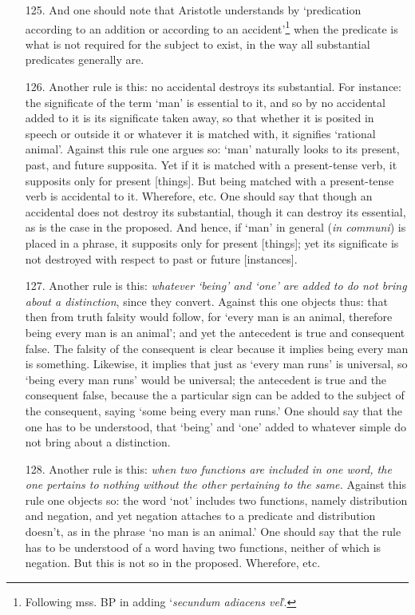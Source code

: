 \documentclass[]{article}
\begin{document}
\begin{itemize}
\item[125.] And one should note that Aristotle understands by `predication according to an addition or according to an accident'\footnote{Following mss. BP in adding `\textit{secundum adiacens vel}'.} when the predicate is what is not required for the subject to exist, in the way all substantial predicates generally are.
\item[126.] Another rule is this: no accidental destroys its substantial. For instance: the significate of the term `man' is essential to it, and so by no accidental added to it is its significate taken away, so that whether it is posited in speech or outside it or whatever it is matched with, it signifies `rational animal'. Against this rule one argues so: `man' naturally looks to its present, past, and future supposita. Yet if it is matched with a present-tense verb, it supposits only for present [things]. But being matched with a present-tense verb is accidental to it. Wherefore, etc. One should say that though an accidental does not destroy its substantial, though it can destroy its essential, as is the case in the proposed. And hence, if `man' in general (\textit{in communi}) is placed in a phrase, it supposits only for present [things]; yet its significate is not destroyed with respect to past or future [instances].
\item[127.] Another rule is this: \textit{whatever `being' and `one' are added to do not bring about a distinction}, since they convert. Against this one objects thus: that then from truth falsity would follow, for `every man is an animal, therefore being every man is an animal'; and yet the antecedent is true and consequent false. The falsity of the consequent is clear because it implies being every man is something. Likewise, it implies that just as `every man runs' is universal, so `being every man runs' would be universal; the antecedent is true and the consequent false, because the a particular sign can be added to the subject of the consequent, saying `some being every man runs.' One should say that the one has to be understood, that `being' and `one' added to whatever simple do not bring about a distinction.
\item[128.] Another rule is this: \textit{when two functions are included in one word, the one pertains to nothing without the other pertaining to the same.} Against this rule one objects so: the word `not' includes two functions, namely distribution and negation, and yet negation attaches to a predicate and distribution doesn't, as in the phrase `no man is an animal.' One should say that the rule has to be understood of a word having two functions, neither of which is negation. But this is not so in the proposed. Wherefore, etc.

\end{itemize}
\end{document}
